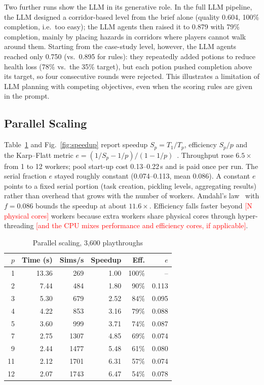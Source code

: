 \documentclass[conference]{IEEEtran}
\newcommand{\fillme}[1]{\textcolor{red}{[#1]}}
\begin{document}
Two further runs show the LLM in its generative role. In the full LLM pipeline, the LLM designed a
corridor-based level from the brief alone (quality 0.604, 100\% completion, i.e.\ too easy); the
LLM agents then raised it to 0.879 with 79\% completion, mainly by placing hazards in corridors
where players cannot walk around them. Starting from the case-study level, however, the LLM agents
reached only 0.750 (vs.\ 0.895 for rules): they repeatedly added potions to reduce health loss
(78\% vs.\ the 35\% target), but each potion pushed completion above its target, so four
consecutive rounds were rejected. This illustrates a limitation of LLM planning with competing
objectives, even when the scoring rules are given in the prompt.

\subsection{Parallel Scaling}
\label{sec:scaling}
Table~\ref{tab:scaling} and Fig.~\ref{fig:speedup} report speedup $S_p=T_1/T_p$, efficiency
$S_p/p$ and the Karp--Flatt metric
$e=(1/S_p-1/p)/(1-1/p)$~\cite{karpflatt1990}. Throughput rose $6.5\times$ from 1 to 12 workers;
pool start-up cost 0.13--0.22\,s and is paid once per run. The serial fraction $e$ stayed roughly
constant (0.074--0.113, mean 0.086). A constant $e$ points to a fixed serial portion (task creation,
pickling levels, aggregating results) rather than overhead that grows with the number of workers.
Amdahl's law~\cite{amdahl1967} with $f=0.086$ bounds the speedup at about $11.6\times$. Efficiency
falls faster beyond \fillme{N physical cores} workers because extra workers share physical cores
through hyper-threading \fillme{and the CPU mixes performance and efficiency cores, if applicable}.

\begin{table}[t]
\caption{Parallel scaling, 3,600 playthroughs}
\label{tab:scaling}
\centering
\footnotesize
\begin{tabular}{@{}rrrrrr@{}}
\toprule
$p$ & Time (s) & Sims/s & Speedup & Eff. & $e$ \\
\midrule
1 & 13.36 & 269 & 1.00 & 100\% & -- \\
2 & 7.44 & 484 & 1.80 & 90\% & 0.113 \\
3 & 5.30 & 679 & 2.52 & 84\% & 0.095 \\
4 & 4.22 & 853 & 3.16 & 79\% & 0.088 \\
\rowcolor{gray!12}
5 & 3.60 & 999 & 3.71 & 74\% & 0.087 \\
7 & 2.75 & 1307 & 4.85 & 69\% & 0.074 \\
9 & 2.44 & 1477 & 5.48 & 61\% & 0.080 \\
11 & 2.12 & 1701 & 6.31 & 57\% & 0.074 \\
12 & 2.07 & 1743 & 6.47 & 54\% & 0.078 \\
\bottomrule
\end{tabular}
\end{table}
\end{document}

